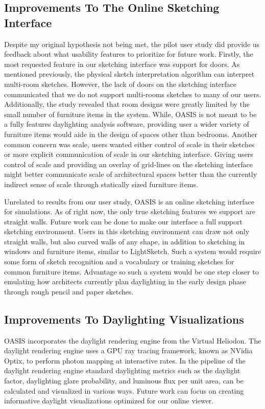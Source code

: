 \subsection{Improvements To The Online Sketching Interface}
Despite my original hypothesis not being met, the pilot user study did provide us feedback about what usability features to prioritize for future work.
Firstly, the most requested feature in our sketching interface was support for doors.
As mentioned previously, the physical sketch interpretation algorithm can interpret multi-room sketches.
However, the lack of doors on the sketching interface communicated that we do not support multi-rooms sketches to many of our users.
Additionally, the study revealed that room designs were greatly limited by the small number of furniture items in the system.
While, OASIS is not meant to be a fully features daylighting analysis software, providing user a wider variety of furniture items would aide in the design of spaces other than bedrooms.
Another common concern was scale, users wanted either control of scale in their sketches or more explicit communication of scale in our sketching interface.
Giving users control of scale and providing an overlay of grid-lines on the sketching interface might better communicate scale of architectural spaces better than the currently indirect sense of scale through statically sized furniture items.

Unrelated to results from our user study, OASIS is an online sketching interface for simulations. As of right now, the only true sketching features we support are straight walls. 
Future work can be done to make our interface a full support sketching environment.
Users in this sketching environment can draw not only straight walls, but also curved walls of any shape, in addition to sketching in windows and furniture items, similar to LightSketch\cite{}.
Such a system would require some form of sketch recognition and a vocabulary or training sketches for common furniture items.
Advantage so such a system would be one step closer to emulating how architects currently plan daylighting in the early design phase through rough pencil and paper sketches.

\subsection{Improvements To Daylighting Visualizations}
OASIS incorporates the daylight rendering engine from the Virtual Heliodon.
The daylight rendering engine uses a GPU ray tracing framework, known as NVidia Optix\cite{}, to perform photon mapping at interactive rates.
In the pipeline of the daylight rendering engine standard daylighting metrics such as the daylight factor, daylighting glare probability, and luminous flux per unit area, can be calculated and visualized in various ways.
Future work can focus on creating informative daylight visualizations optimized for our online viewer.\\


